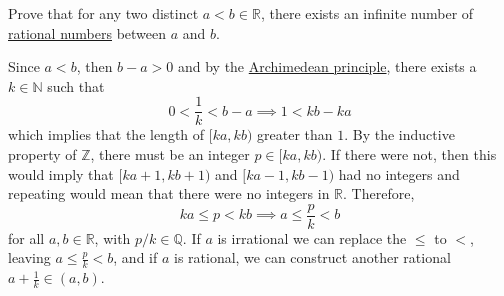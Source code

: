  \begin{exercise}
    Prove that for any two distinct $a < b \in \mathbb{R}$, there exists an infinite number of \hyperref[alg-def:rational-numbers]{rational numbers} between $a$ and $b$. 
  \end{exercise}
  \begin{solution}
    Since $a< b$, then $b - a > 0$ and by the \hyperref[def:archimedean-principle]{Archimedean principle}, there exists a $k \in \mathbb{N}$ such that 
    \begin{equation}
      0 < \frac{1}{k} < b - a \implies 1 < kb - ka
    \end{equation}
    which implies that the length of $[ka, kb)$ greater than $1$. By the inductive property of $\mathbb{Z}$, there must be an integer $p \in [ka, kb)$. If there were not, then this would imply that $[ka+1, kb+1)$ and $[ka-1, kb-1)$ had no integers and repeating would mean that there were no integers in $\mathbb{R}$. Therefore, 
    \begin{equation}
      ka \leq p < kb \implies a \leq \frac{p}{k} < b
    \end{equation}
    for all $a, b \in \mathbb{R}$, with $p/k \in \mathbb{Q}$. If $a$ is irrational we can replace the $\leq$ to $<$, leaving $a \leq \frac{p}{k} < b$, and if $a$ is rational, we can construct another rational $a + \frac{1}{k} \in (a, b)$. 
  \end{solution}

